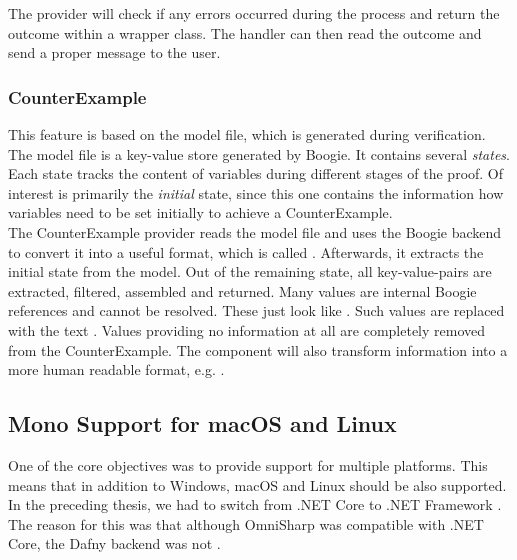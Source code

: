 The provider will check if any errors occurred during the process and return the outcome within a wrapper class.
The handler can then read the outcome and send a proper message to the user.

\subsubsection{CounterExample}
This feature is based on the model file, which is generated during verification.
The model file is a key-value store generated by Boogie.
It contains several \textit{states}.
Each state tracks the content of variables during different stages of the proof.
Of interest is primarily the \textit{initial} state, since this one contains the information how variables
need to be set initially to achieve a CounterExample.\\

The CounterExample provider reads the model file and uses the Boogie backend to convert it into a useful format, which is called .
Afterwards, it extracts the initial state from the model.
Out of the remaining state, all key-value-pairs are extracted, filtered, assembled and returned.
Many values are internal Boogie references and cannot be resolved.
These just look like .
Such values are replaced with the text .
Values providing no information at all are completely removed from the CounterExample.
The component will also transform information into a more human readable format, e.g. .\\






\subsection{Mono Support for macOS and Linux}
\label{section:implementation:mono}
One of the core objectives was to provide support for multiple platforms.
This means that in addition to Windows, macOS and Linux should be also supported. \\

In the preceding thesis, we had to switch from .NET Core to .NET Framework \cite{sa}.
The reason for this was that although OmniSharp was compatible with .NET Core,
the Dafny backend was not \cite{sa}.\\

